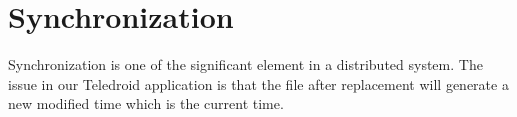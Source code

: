 \section{Synchronization}
\label{sec:Synchronization}
Synchronization is one of the significant element in a distributed system. The issue in our Teledroid application is that the file after replacement will generate a new modified time which is the current time.


